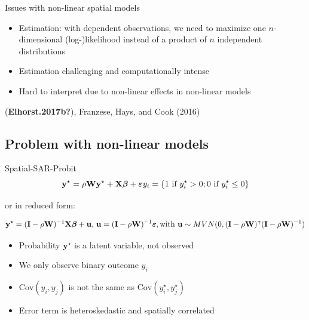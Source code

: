\documentclass[
  letterpaper,
  DIV=11,
  numbers=noendperiod]{scrreprt}
\begin{document}
Issues with non-linear spatial models

\begin{itemize}
\item
  Estimation: with dependent observations, we need to maximize one
  \(n\)-dimensional (log-)likelihood instead of a product of \(n\)
  independent distributions
\item
  Estimation challenging and computationally intense
\item
  Hard to interpret due to non-linear effects in non-linear models
\end{itemize}

(\textbf{Elhorst.2017b?}), Franzese, Hays, and Cook (2016)

\hypertarget{problem-with-non-linear-models}{%
\subsection{Problem with non-linear
models}\label{problem-with-non-linear-models}}

Spatial-SAR-Probit \[
        {\boldsymbol{\mathbf{y}}^\star}=\rho{\boldsymbol{\mathbf{W}}}{\boldsymbol{\mathbf{y}}^\star}+{\boldsymbol{\mathbf{X}}}{\boldsymbol{\mathbf{\beta}}}+ {\boldsymbol{\mathbf{\varepsilon}}} \\     
        y_i = \{1 \text{ if } y_i^\star > 0; 0 \text{ if } y_i^\star \leq 0 \} \nonumber
\]

or in reduced form:

\[
        {\boldsymbol{\mathbf{y}}^\star}=(\boldsymbol{\mathbf{I}} - \rho{\boldsymbol{\mathbf{W}}})^{-1}{\boldsymbol{\mathbf{X}}}{\boldsymbol{\mathbf{\beta}}} + \boldsymbol{\mathbf{u}} \text{, } \boldsymbol{\mathbf{u}} = (\boldsymbol{\mathbf{I}} - \rho{\boldsymbol{\mathbf{W}}})^{-1}{\boldsymbol{\mathbf{\varepsilon}}},\\
        \text{with } \boldsymbol{\mathbf{u}} \sim MVN(0, (\boldsymbol{\mathbf{I}} - \rho{\boldsymbol{\mathbf{W}}})^\intercal (\boldsymbol{\mathbf{I}} - \rho{\boldsymbol{\mathbf{W}}})^{-1}) \nonumber
\]

\begin{itemize}
\item
  Probability \(\boldsymbol{\mathbf{y}}^\star\) is a latent variable,
  not observed
\item
  We only observe binary outcome \(y_i\)
\item
  \(\mathrm{Cov}(y_i, y_j)\) is not the same as
  \(\mathrm{Cov}(y_i^\star, y_j^\star)\)
\item
  Error term is heteroskedastic and spatially correlated
\end{itemize}
\end{document}
